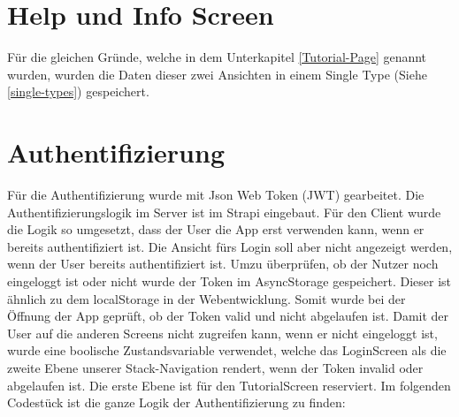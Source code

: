 \section{Help und Info Screen}

Für die gleichen Gründe, welche in dem Unterkapitel \ref{Tutorial-Page} genannt wurden, wurden die Daten dieser zwei Ansichten in einem Single Type (Siehe  \ref{single-types}) gespeichert.


\section{Authentifizierung}
Für die Authentifizierung wurde mit Json Web Token (JWT) gearbeitet. Die Authentifizierungslogik im Server ist im Strapi eingebaut. Für den Client wurde die Logik so umgesetzt, dass der User die App erst verwenden kann, wenn er bereits authentifiziert ist.
Die Ansicht fürs Login soll aber nicht angezeigt werden, wenn der User bereits authentifiziert ist.
Umzu überprüfen, ob der Nutzer noch eingeloggt ist oder nicht wurde der Token im AsyncStorage gespeichert. Dieser ist ähnlich zu dem localStorage in der Webentwicklung. Somit wurde bei der Öffnung der App geprüft, ob der Token valid und nicht abgelaufen ist.
Damit der User auf die anderen Screens nicht zugreifen kann, wenn er nicht eingeloggt ist, wurde eine boolische Zustandsvariable verwendet, welche das LoginScreen als die zweite Ebene unserer Stack-Navigation rendert, wenn der Token invalid oder abgelaufen ist. Die erste Ebene ist für den TutorialScreen reserviert.
Im folgenden Codestück ist die ganze Logik der Authentifizierung zu finden:
